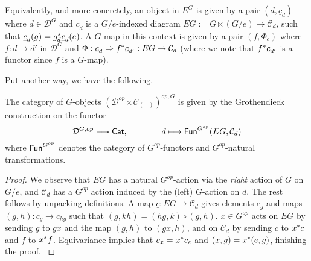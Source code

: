 \documentclass[a4paper,10pt
,draft
]{article}%
\renewcommand{\1}{\eta}%
\begin{document}
Equivalently, and more concretely,
an object in $E^G$ is given by a pair $(d, \underline{c}_d)$ where
$d \in \mathcal D^G$ and
$\underline{c}_d$ is a $G/e$-indexed diagram
$E G := G \ltimes (G/e) \to \mathcal C_d$,
such that $\underline{c}_d(g) = g_{d}^{\**}\underline{c}_d(e)$.
A $G$-map in this context is given by a pair $(f, \Phi_c)$ where
$f: d \to d'$ in $\mathcal D^G$ and
$\Phi: \underline{c}_d \Rightarrow f^{\**}\underline{c}_{d'}: E G \to \mathcal C_d$
(where we note that $f^{\**}\underline{c}_{d'}$ is a functor since $f$ is a $G$-map).

Put another way, we have the following.
\begin{lemma}
      \label{G_GR_LEM}
      The category of $G$-objects
      $\left(\mathcal D^{op} \ltimes \mathcal C_{(-)}\right)^{op,G}$
      is given by the Grothendieck construction on the functor
      \begin{equation}
            \mathcal D^{G,op} \longrightarrow \mathsf{Cat},
            \qquad \qquad
            d \longmapsto \mathsf{Fun}^{G^{op}}(E G, \mathcal C_d)
      \end{equation}
      where $\mathsf{Fun}^{G^{op}}$ denotes the category of $G^{op}$-functors and $G^{op}$-natural transformations.
\end{lemma}
\begin{proof}
      We observe that $EG$ has a natural $G^{op}$-action via the \textit{right} action of $G$ on $G/e$,
      and $\mathcal C_d$ has a $G^{op}$ action induced by the (left) $G$-action on $d$.
      The rest follows by unpacking definitions.
      {\color{OliveGreen}
        A map $\underline{c}: EG \to \mathcal C_d$ gives elements $c_g$ and maps $(g,h): c_g \to c_{hg}$ such that
        $(g, kh) = (hg, k) \circ (g, h)$.
        $x \in G^{op}$ acts on $EG$ by sending $g$ to $g x$ and the map $(g,h)$ to $(g x,h)$,
        and on $\mathcal C_d$ by sending $c$ to $x^{\**}c$ and $f$ to $x^{\**}f$.
        Equivariance implies that $c_x = x^{\**}c_e$ and $(x,g) = x^{\**}(e,g)$, finishing the proof.
      }
\end{proof}
\end{document}

